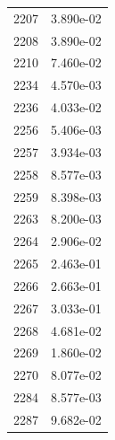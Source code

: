 \documentclass[12pt]{article}
\begin{document}
\begin{longtable}{@{}cc@{}}
2207 & 3.890e-02 \\
2208 & 3.890e-02 \\
2210 & 7.460e-02 \\
2234 & 4.570e-03 \\
2236 & 4.033e-02 \\
2256 & 5.406e-03 \\
2257 & 3.934e-03 \\
2258 & 8.577e-03 \\
2259 & 8.398e-03 \\
2263 & 8.200e-03 \\
2264 & 2.906e-02 \\
2265 & 2.463e-01 \\
2266 & 2.663e-01 \\
2267 & 3.033e-01 \\
2268 & 4.681e-02 \\
2269 & 1.860e-02 \\
2270 & 8.077e-02 \\
2284 & 8.577e-03 \\
2287 & 9.682e-02 \\

\bottomrule
\end{longtable}
\end{document}
